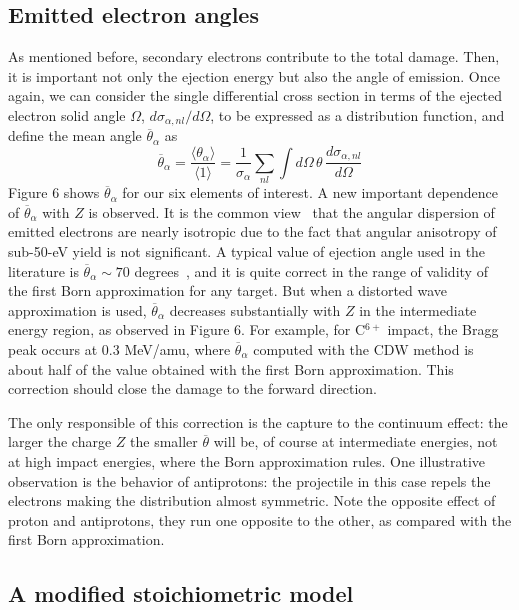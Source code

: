 \documentclass[preprint,12pt]{article}
\begin{document}
\subsection{Emitted electron angles}

As mentioned before, secondary electrons contribute to the total damage. 
Then, it is important not only the ejection energy but also the angle 
of emission. Once again, we can consider the single differential cross 
section in terms of the ejected electron solid angle $\Omega$, 
$d\sigma_{\alpha,nl}/d\Omega$, to be expressed as a distribution 
function, and define the mean angle $\overline{\theta}_{\alpha}$ as
\begin{equation}
\overline{\theta}_{\alpha}=\frac{\langle\theta_{\alpha}\rangle}
{\langle 1\rangle}=\frac{1}{\sigma_{\alpha}}\sum\limits_{nl}
\int d\Omega\,\theta\,\frac{d\sigma_{\alpha,nl}}{d\Omega}
\end{equation}
Figure 6 shows $\overline{\theta}_{\alpha}$ for our six elements of 
interest. A new important dependence of $\overline{\theta}_{\alpha}$ 
with $Z$ is observed. It is the common view~\cite{Rudd1992} that the 
angular dispersion of emitted electrons are nearly isotropic due to the
fact that angular anisotropy of sub-50-eV yield is not significant. 
A typical value of ejection angle used in the literature is 
$\overline{\theta}_{\alpha}\sim 70$ degrees~\cite{surdutovic2018}, and 
it is quite correct in the range of validity of the first Born 
approximation for any target. But when a distorted wave approximation 
is used, $\overline{\theta}_{\alpha}$ decreases substantially with $Z$ 
in the intermediate energy region, as observed in Figure 6. 
For example, for C$^{6+}$ impact, the Bragg peak occurs at 0.3 MeV/amu, 
where $\overline{\theta}_{\alpha}$ computed with the CDW method is 
about half of the value obtained with the first Born approximation. 
This correction should close the damage to the forward direction.

The only responsible of this correction is the capture to the continuum
effect: the larger the charge $Z$ the smaller $\overline{\theta}$ will 
be, of course at intermediate energies, not at high impact energies, 
where the Born approximation rules. One illustrative observation is the 
behavior of antiprotons: the projectile in this case repels the 
electrons making the distribution almost symmetric. Note the opposite 
effect of proton and antiprotons, they run one opposite to the other, 
as compared with the first Born approximation.

\subsection{A modified stoichiometric model}
\end{document}
